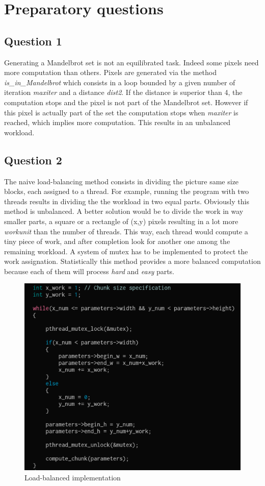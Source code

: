 \section*{Preparatory questions}
\thispagestyle{empty}

\subsection*{Question 1}

Generating a Mandelbrot set is not an equilibrated task. Indeed some
pixels need more computation than others. Pixels are generated via the method 
\textit{is\_in\_Mandelbrot} 
which consists in a loop bounded by a given number of iteration
\textit{maxiter} and a distance \textit{dist2}. If the distance is superior
than 4, the computation stops and the pixel is not part of the Mandelbrot
set. However if this pixel is actually part of the set the computation stops
when \textit{maxiter} is reached, which implies more computation. 
This results in an unbalanced workload. 

\subsection*{Question 2}

The naive load-balancing method consists in dividing the picture same size 
blocks, each assigned to a thread. For example, running the program with two
threads results in dividing the the workload in two equal parts. Obviously
this method is unbalanced.
A better solution would be to divide the work in way smaller parts, a 
square or a rectangle of (x,y) pixels resulting in a lot more \textit{workunit}
than the number of threads.
This way, each thread would compute a tiny piece of work, and after completion
look for another one among the remaining workload. A system of mutex has to
be implemented to protect the work assignation.
Statistically this method provides a more balanced computation because each of
them will process \textit{hard} and \textit{easy} parts.

\vspace*{1em}
\begin{figure}[h]
    \centering
 \includegraphics[width=.70\linewidth,scale=1]{./images/0.png} 
    \caption{Load-balanced implementation}
\end{figure}
\newpage
\thispagestyle{empty}

